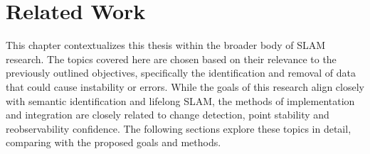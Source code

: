\section{Related Work}
\label{sec:related_work}

This chapter contextualizes this thesis within the broader body of SLAM research. The topics covered here are chosen based on their relevance to the previously outlined objectives, specifically the identification and removal of data that could cause instability or errors. While the goals of this research align closely with semantic identification and lifelong SLAM, the methods of implementation and integration are  closely related to change detection, point stability and reobservability confidence. The following sections explore these topics in detail, comparing with the proposed goals and methods.
% 